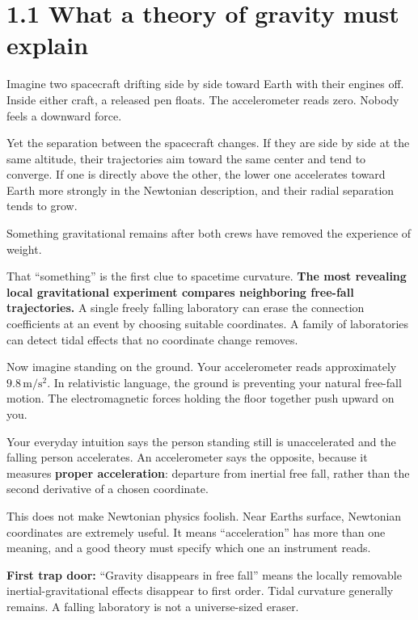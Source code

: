 \documentclass[
  11pt,
  letterpaper,
  oneside,
  openany]{scrbook}
\renewenvironment{quote}{\begin{tcolorbox}[enhanced,breakable,sharp corners,colback=pale,colframe=accent,boxrule=0pt,borderline west={2pt}{0pt}{accent},left=10pt,right=10pt,top=7pt,bottom=7pt]}{\end{tcolorbox}}
\begin{document}
\hypertarget{what-a-theory-of-gravity-must-explain}{%
\section{1.1 What a theory of gravity must
explain}\label{what-a-theory-of-gravity-must-explain}}

Imagine two spacecraft drifting side by side toward Earth with their
engines off. Inside either craft, a released pen floats. The
accelerometer reads zero. Nobody feels a downward force.

Yet the separation between the spacecraft changes. If they are side by
side at the same altitude, their trajectories aim toward the same center
and tend to converge. If one is directly above the other, the lower one
accelerates toward Earth more strongly in the Newtonian description, and
their radial separation tends to grow.

Something gravitational remains after both crews have removed the
experience of weight.

That ``something'' is the first clue to spacetime curvature. \textbf{The
most revealing local gravitational experiment compares neighboring
free-fall trajectories.} A single freely falling laboratory can erase
the connection coefficients at an event by choosing suitable
coordinates. A family of laboratories can detect tidal effects that no
coordinate change removes.

Now imagine standing on the ground. Your accelerometer reads
approximately \(9.8\,\mathrm{m/s^2}\). In relativistic language, the
ground is preventing your natural free-fall motion. The electromagnetic
forces holding the floor together push upward on you.

Your everyday intuition says the person standing still is unaccelerated
and the falling person accelerates. An accelerometer says the opposite,
because it measures \textbf{proper acceleration}: departure from
inertial free fall, rather than the second derivative of a chosen
coordinate.

This does not make Newtonian physics foolish. Near
Earth\textquotesingle s surface, Newtonian coordinates are extremely
useful. It means ``acceleration'' has more than one meaning, and a good
theory must specify which one an instrument reads.

\begin{quote}
\textbf{First trap door:} ``Gravity disappears in free fall'' means the
locally removable inertial-gravitational effects disappear to first
order. Tidal curvature generally remains. A falling laboratory is not a
universe-sized eraser.
\end{quote}
\end{document}
